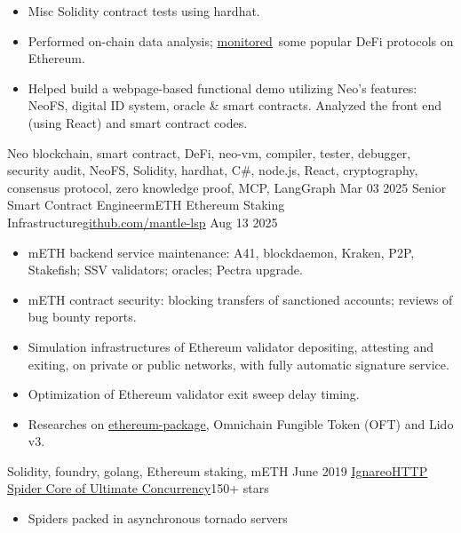 \begin{experiences}
{\begin{itemize}
                        \item Misc Solidity contract tests using hardhat.
                        \item Performed on-chain data analysis; \href{https://github.com/Hecate2/eth_rpc_monitor/}{\underline{monitored}}\, some popular DeFi protocols on Ethereum.
                        \item Helped build a webpage-based functional demo utilizing Neo's features: NeoFS, digital ID system, oracle \& smart contracts. Analyzed the front end (using React) and smart contract codes. 
                      \end{itemize}
                    }
                    {Neo blockchain, smart contract, DeFi, neo-vm, compiler, tester, debugger, security audit, NeoFS, Solidity, hardhat, C\#, node.js, React, cryptography, consensus protocol, zero knowledge proof, MCP, LangGraph}
  \emptySeparator
 \experience
    {Mar 03 2025}     {Senior Smart Contract Engineer}{mETH Ethereum Staking Infrastructure}{\href{https://github.com/mantle-lsp}{\underline{github.com/mantle-lsp}}}
    {Aug 13 2025}    {
        \begin{itemize}
            \item mETH backend service maintenance: A41, blockdaemon, Kraken, P2P, Stakefish; SSV validators; oracles; Pectra upgrade.
            \item mETH contract security: blocking transfers of sanctioned accounts; reviews of bug bounty reports.
            \item Simulation infrastructures of Ethereum validator depositing, attesting and exiting, on private or public networks, with fully automatic signature service.
            \item Optimization of Ethereum validator exit sweep delay timing.
            \item Researches on \href{https://github.com/ethpandaops/ethereum-package}{\underline{ethereum-package}}, Omnichain Fungible Token (OFT) and Lido v3.
        \end{itemize}
                    }
                    {Solidity, foundry, golang, Ethereum staking, mETH}
  \emptySeparator
  \experience
    {June 2019} {\href{https://github.com/Hecate2/Ignareo-ISML-auto-voter}{\underline{Ignareo}}}{\href{https://github.com/Hecate2/Ignareo-ISML-auto-voter}{HTTP Spider Core of Ultimate Concurrency}}{150+ stars}
    {}    {
                      \begin{itemize}
                        \item Spiders packed in asynchronous tornado servers

\end{itemize}}
\end{experiences}
